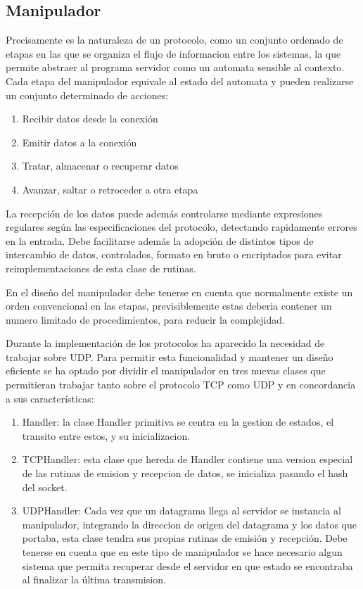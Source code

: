 \documentclass[a4paper,spanish,12pt]{book}
\begin{document}
\subsection{Manipulador}
Precisamente es la naturaleza de un protocolo, como un conjunto ordenado de etapas en las que se organiza el flujo de informacion entre los sistemas, la que permite abstraer al programa servidor como un automata sensible al contexto. Cada etapa del manipulador equivale al estado del automata y pueden realizarse un conjunto determinado de acciones:
\begin{enumerate}
	\item Recibir datos desde la conexión
	\item Emitir datos a la conexión
	\item Tratar, almacenar o recuperar datos
	\item Avanzar, saltar o retroceder a otra etapa
\end{enumerate}

La recepción de los datos puede además controlarse mediante expresiones regulares según las especificaciones del protocolo, detectando rapidamente errores en la entrada. Debe facilitarse además la adopción de distintos tipos de intercambio de datos, controlados, formato en bruto o encriptados para evitar reimplementaciones de esta clase de rutinas.

En el diseño del manipulador debe tenerse en cuenta que normalmente existe un orden convencional en las etapas, previsiblemente estas deberia contener un numero limitado de procedimientos, para reducir la complejidad.

Durante la implementación de los protocolos ha aparecido la necesidad de trabajar sobre UDP. Para permitir esta funcionalidad y mantener un diseño eficiente se ha optado por dividir el manipulador en tres nuevas clases que permitieran trabajar tanto sobre el protocolo TCP como UDP y en concordancia a sus características:
\begin{enumerate}
	\item{Handler: la clase Handler primitiva se centra en la gestion de estados, el transito entre estos, y su inicializacion.}
	\item{TCPHandler: esta clase que hereda de Handler contiene una version especial de las rutinas de emision y recepcion de datos, se inicializa pasando el hash del socket.}
	\item{UDPHandler: Cada vez que un datagrama llega al servidor se instancia al manipulador, integrando la direccion de origen del datagrama y los datos que portaba, esta clase tendra sus propias rutinas de emisión y recepción. Debe tenerse en cuenta que en este tipo de manipulador se hace necesario algun sistema que permita recuperar desde el servidor en que estado se encontraba al finalizar la última transmision.}
\end{enumerate}
\end{document}
